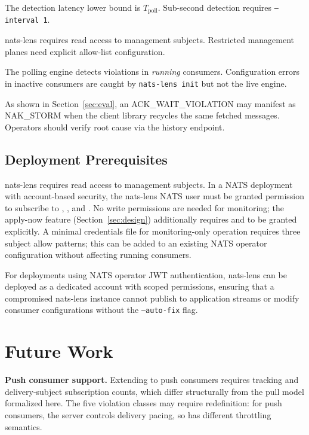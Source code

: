 \documentclass[journal]{IEEEtran}
\begin{document}
The detection latency lower bound is $T_\text{poll}$. Sub-second detection
requires \texttt{--interval 1}.

nats-lens requires read access to  management subjects.
Restricted management planes need explicit allow-list configuration.

The polling engine detects violations in \emph{running} consumers.
Configuration errors in inactive consumers are caught by
\texttt{nats-lens init} but not the live engine.

As shown in Section~\ref{sec:eval}, an ACK\_WAIT\_VIOLATION may manifest
as NAK\_STORM when the client library recycles the same fetched messages.
Operators should verify root cause via the history endpoint.

\subsection*{Deployment Prerequisites}

nats-lens requires read access to  management subjects.
In a NATS deployment with account-based security, the nats-lens NATS
user must be granted permission to subscribe to
, , and
. No write permissions are needed
for monitoring; the apply-now feature (Section~\ref{sec:design})
additionally requires  and
 to be granted explicitly.
A minimal credentials file for monitoring-only operation requires
three subject allow patterns; this can be added to an existing
NATS operator configuration without affecting running consumers.

For deployments using NATS operator JWT authentication, nats-lens
can be deployed as a dedicated account with scoped permissions,
ensuring that a compromised nats-lens instance cannot publish to
application streams or modify consumer configurations without the
\texttt{--auto-fix} flag.

\section{Future Work}
\label{sec:future}

\textbf{Push consumer support.} Extending to push consumers requires
tracking  and delivery-subject subscription
counts, which differ structurally from the pull model formalized here.
The five violation classes may require redefinition: for push consumers,
the server controls delivery pacing, so  has
different throttling semantics.
\end{document}

